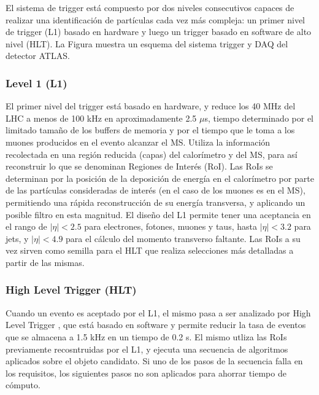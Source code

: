 El sistema de trigger está compuesto por dos niveles consecutivos capaces de realizar una identificación de partículas cada vez más compleja: un primer nivel de trigger (L1) basado en hardware y luego un trigger basado en software de alto nivel (HLT). La Figura  muestra un esquema del sistema trigger y DAQ del detector ATLAS.

\subsubsection{Level 1 (L1)}

El primer nivel del trigger \cite{level1} está basado en hardware, y reduce los 40 MHz del LHC a menos de 100 kHz en aproximadamente 2.5 $\mu$s, tiempo determinado por el limitado tamaño de los buffers de memoria y por el tiempo que le toma a los muones producidos en el evento alcanzar el MS. Utiliza la información recolectada en una región reducida (capas) del calorímetro y del MS, para así reconstruir lo que se denominan Regiones de Interés (RoI). Las RoIs se determinan por la posición de la deposición de energía en el calorímetro por parte de las partículas consideradas de interés (en el caso de los muones es en el MS), permitiendo una rápida reconstrucción de su energía transversa, y aplicando un posible filtro en esta magnitud. El diseño del L1 permite tener una aceptancia en el rango de $|\eta|<2.5$ para electrones, fotones, muones y taus, hasta $|\eta|<3.2$ para jets, y $|\eta|<4.9$ para el cálculo del momento transverso faltante. Las RoIs a su vez sirven como semilla para el HLT que realiza selecciones más detalladas a partir de las mismas.

\subsubsection{High Level Trigger (HLT)}

Cuando un evento es aceptado por el L1, el mismo pasa a ser analizado por High Level Trigger \cite{ATLAS-TDR-16}, que está basado en software y permite reducir la tasa de eventos que se almacena a 1.5 kHz en un tiempo de 0.2 s. El mismo utliza las RoIs previamente recosntruidas por el L1, y ejecuta una secuencia de algoritmos aplicados sobre el objeto candidato. Si uno de los pasos de la secuencia falla en los requisitos, los siguientes pasos no son aplicados para ahorrar tiempo de cómputo. 


